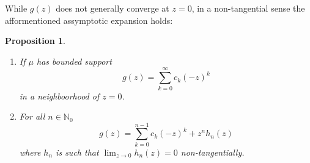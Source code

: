 \documentclass{amsart}
\newtheorem{proposition}[theorem]{Proposition}
\theoremstyle{remark}
\numberwithin{equation}{section}
\newcommand{\NN}{\mathbb{N}}
\begin{document}
While $g(z)$ does not generally converge at $z = 0$, in a non-tangential sense the afformentioned assymptotic expansion holds:
\begin{proposition}
\begin{enumerate}
\item If $\mu$ has bounded support
\[
    g(z) = \sum_{k = 0}^\infty c_k(-z)^k
\]
in a neighboorhood of $z=0$.
\item For all $n \in \NN_0$
\begin{equation}
    g(z) = \sum_{k = 0}^{n-1} c_k(-z)^k + z^n h_n(z) \label{assexp}
\end{equation}
where $h_n$ is such that $\lim_{z \rightarrow 0} h_n(z) = 0$ non-tangentially.
\end{enumerate}
\end{proposition}
\end{document}
